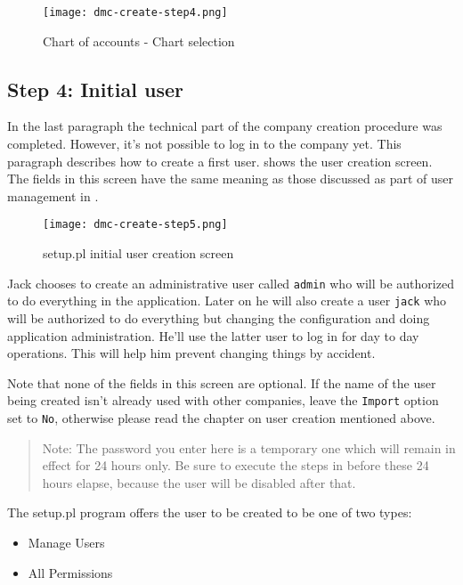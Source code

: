 \begin{figure}[h]
\centering
\texttt{[image: dmc-create-step4.png]}
\caption{Chart of accounts - Chart selection}
\label{fig:setup-step4}
\end{figure}


\subsection{Step 4: Initial user}
\label{subsec-create-setup-initial-user}

In the last paragraph the technical part of the company creation procedure was completed.
However, it's not possible to log in to the company yet. This paragraph describes how to
create a first user.
 shows the user creation screen. The fields in this screen have
the same meaning as those discussed as part of user management in .

\begin{figure}[h]
\centering
\texttt{[image: dmc-create-step5.png]}
\caption{setup.pl initial user creation screen}
\label{fig:setup-step5}
\end{figure}

Jack chooses to create an administrative user called \texttt{admin} who will be authorized
to do everything in the application. Later on he will also create a user \texttt{jack}
who will be authorized to do everything but changing the configuration and doing application administration.
He'll use the latter user to log in for day to day operations. This will help him prevent
changing things by accident.

Note that none of the fields in this screen are optional. If the name of the user being created
isn't already used with other companies, leave the \texttt{Import} option set to \texttt{No},
otherwise please read the chapter on user creation mentioned above.

\begin{quotation}
Note: The password you enter here is a temporary one which will remain in effect for 24
hours only. Be sure to execute the steps in  before
these 24 hours elapse, because the user will be disabled after that.
\end{quotation}

The setup.pl program offers the user to be created to be one of two types:

\begin{itemize}
\item Manage Users
\item All Permissions
\end{itemize}

